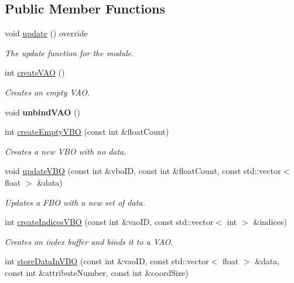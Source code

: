 \subsection*{Public Member Functions}
\begin{DoxyCompactItemize}
\item 
void \hyperlink{classflounder_1_1loaders_a9becf522a74f35f7e3dc7839577ba736}{update} () override
\begin{DoxyCompactList}\small\item\em The update function for the module. \end{DoxyCompactList}\item 
int \hyperlink{classflounder_1_1loaders_a6788892ee32899599c65722fe1ccfbf3}{create\+V\+AO} ()
\begin{DoxyCompactList}\small\item\em Creates an empty V\+AO. \end{DoxyCompactList}\item 
\mbox{\label{classflounder_1_1loaders_ad408dde74d3bcf097ce9dd97c29e7f12}} 
void {\bfseries unbind\+V\+AO} ()
\item 
int \hyperlink{classflounder_1_1loaders_ada5cb20e8df0224b0bc8e7da407ba254}{create\+Empty\+V\+BO} (const int \&float\+Count)
\begin{DoxyCompactList}\small\item\em Creates a new V\+BO with no data. \end{DoxyCompactList}\item 
void \hyperlink{classflounder_1_1loaders_ae0a4be86dc15991197f2f98c4a7eaa1f}{update\+V\+BO} (const int \&vbo\+ID, const int \&float\+Count, const std\+::vector$<$ float $>$ \&data)
\begin{DoxyCompactList}\small\item\em Updates a F\+BO with a new set of data. \end{DoxyCompactList}\item 
int \hyperlink{classflounder_1_1loaders_af17aa2917eb49dc484908617bb806cd7}{create\+Indices\+V\+BO} (const int \&vao\+ID, const std\+::vector$<$ int $>$ \&indices)
\begin{DoxyCompactList}\small\item\em Creates an index buffer and binds it to a V\+AO. \end{DoxyCompactList}\item 
int \hyperlink{classflounder_1_1loaders_a3fe87c11a6a2e9f3893c847b556d43c2}{store\+Data\+In\+V\+BO} (const int \&vao\+ID, const std\+::vector$<$ float $>$ \&data, const int \&attribute\+Number, const int \&coord\+Size)

\end{DoxyCompactItemize}
